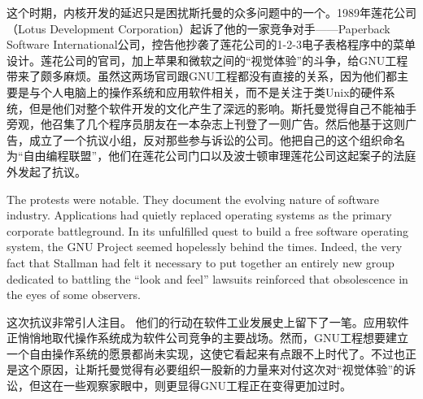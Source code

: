 \ifdefined\chs
这个时期，内核开发的延迟只是困扰斯托曼的众多问题中的一个。1989年莲花公司（Lotus Development Corporation）起诉了他的一家竞争对手——Paperback Software International公司，控告他抄袭了莲花公司的1-2-3电子表格程序中的菜单设计。莲花公司的官司，加上苹果和微软之间的``视觉体验''的斗争，给GNU工程带来了颇多麻烦。虽然这两场官司跟GNU工程都没有直接的关系，因为他们都主要是与个人电脑上的操作系统和应用软件相关，而不是关注于类Unix的硬件系统，但是他们对整个软件开发的文化产生了深远的影响。斯托曼觉得自己不能袖手旁观，他召集了几个程序员朋友在一本杂志上刊登了一则广告。然后他基于这则广告，成立了一个抗议小组，反对那些参与诉讼的公司。他把自己的这个组织命名为``自由编程联盟''，他们在莲花公司门口以及波士顿审理莲花公司这起案子的法庭外发起了抗议。
\fi

\ifdefined\eng
The protests were notable. They document the evolving nature of software industry. Applications had quietly replaced operating systems as the primary corporate battleground. In its unfulfilled quest to build a free software operating system, the GNU Project seemed hopelessly behind the times. Indeed, the very fact that Stallman had felt it necessary to put together an entirely new group dedicated to battling the ``look and feel'' lawsuits reinforced that obsolescence in the eyes of some observers.
\fi

\ifdefined\chs
这次抗议非常引人注目。 他们的行动在软件工业发展史上留下了一笔。应用软件正悄悄地取代操作系统成为软件公司竞争的主要战场。然而，GNU工程想要建立一个自由操作系统的愿景都尚未实现，这使它看起来有点跟不上时代了。不过也正是这个原因，让斯托曼觉得有必要组织一股新的力量来对付这次对``视觉体验''的诉讼，但这在一些观察家眼中，则更显得GNU工程正在变得更加过时。
\fi

